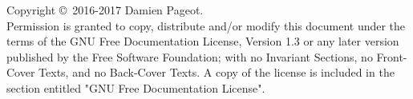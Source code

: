 \null\vfill
{}
\noindent Copyright \copyright\ 2016-2017 Damien Pageot.\\

\noindent Permission is granted to copy, distribute and/or modify this document under the terms of the GNU Free Documentation License, Version 1.3 or any later version published by the Free Software Foundation; with no Invariant Sections, no Front-Cover Texts, and no Back-Cover Texts. A copy of the license is included in the section entitled "GNU Free Documentation License".
\clearpage\newpage
